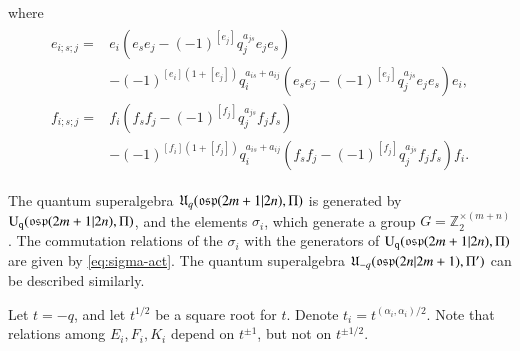\documentclass[12pt]{amsart}
\theoremstyle{definition}
\theoremstyle{remark}
\numberwithin{equation}{section}
\begin{document}
where
\begin{eqnarray}\label{eq:Uab-higher order ef}
\begin{aligned}
e_{i;s;j}=&e_i(e_se_j-(-1)^{[e_j]}q_j^{a_{js}}e_je_s)\\
		&-(-1)^{[e_i](1+[e_j])}q_i^{a_{is}+a_{ij}}(e_se_j-(-1)^{[e_j]}q_j^{a_{js}}e_je_s)e_i,\\
f_{i;s;j}=&f_i(f_sf_j-(-1)^{[f_j]}q_j^{a_{js}}f_jf_s)\\
	&-(-1)^{[f_i](1+[f_j])}q_i^{a_{is}+a_{ij}}(f_sf_j-(-1)^{ [f_j]}q_j^{a_{js}}f_jf_s)f_i.
\end{aligned}
\end{eqnarray}

The quantum superalgebra ${{\mathfrak U}}_q({{\rm\mathfrak{osp}}}(2m+1|2n), \Pi)$ is generated by
${{\rm{U}_q}}({{\rm\mathfrak{osp}}}(2m+1|2n), \Pi)$, and the elements $\sigma_i$, which generate a group $G={{\mathbb Z}}_2^{\times (m+n)}$.
The commutation relations of the $\sigma_i$ with the generators of ${{\rm{U}_q}}({{\rm\mathfrak{osp}}}(2m+1|2n), \Pi)$ are given by \eqref{eq:sigma-act}.
The quantum superalgebra ${{\mathfrak U}}_{-q}({{\rm\mathfrak{osp}}}(2n|2m+1), \Pi')$ can be described similarly.

Let $t=-q$, and let $t^{1/2}$ be a square root  for $t$. Denote $t_i=t^{(\alpha_i,\alpha_i)/2}$. Note that relations among $E_i, F_i, K_i$ depend on $t^{\pm 1}$, but not  on $t^{\pm 1/2}$.
\end{document}
